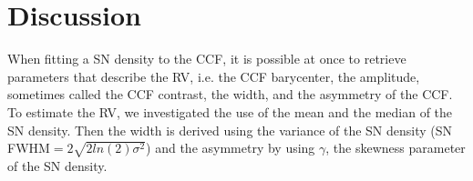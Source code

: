 \documentclass{aa}
\begin{document}


\section{Discussion} \label{sec:discu}

When fitting a SN density to the CCF, it is possible at once to retrieve parameters that describe the RV, i.e. the CCF barycenter, the amplitude, sometimes called the CCF contrast, the width, and the asymmetry of the CCF. To estimate the RV, we investigated the use of the mean and the median of the SN density. Then the width is derived using the variance of the SN density (SN FWHM$=2\sqrt{2ln(2)\sigma^2}$) and the asymmetry by using $\gamma$, the skewness parameter of the SN density.
\end{document}
